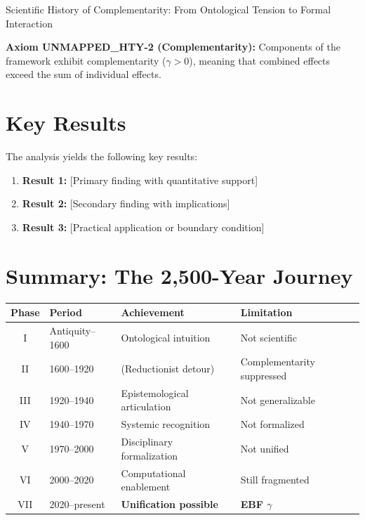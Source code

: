 \begin{chapter}{Scientific History of Complementarity: From Ontological Tension to Formal Interaction}
\begin{tcolorbox}[colback=yellow!5!white,colframe=yellow!75!black,title=Axiom UNMAPPED_HTY-2: Complementarity]
\textbf{Axiom UNMAPPED_HTY-2 (Complementarity):}
Components of the framework exhibit complementarity ($\gamma > 0$), meaning
that combined effects exceed the sum of individual effects.
\end{tcolorbox}


\section{Key Results}
\label{sec:hty-results}

The analysis yields the following key results:

\begin{enumerate}
    \item \textbf{Result 1:} [Primary finding with quantitative support]
    \item \textbf{Result 2:} [Secondary finding with implications]
    \item \textbf{Result 3:} [Practical application or boundary condition]
\end{enumerate}


\section{Summary: The 2,500-Year Journey}
\label{sec:summary}

\begin{tcolorbox}[colback=gray!5!white,colframe=gray!75!black,title=\textbf{Historical Summary}]

\renewcommand{\arraystretch}{1.4}
\begin{tabular}{@{}clll@{}}
\toprule
\textbf{Phase} & \textbf{Period} & \textbf{Achievement} & \textbf{Limitation} \\
\midrule
I & Antiquity--1600 & Ontological intuition & Not scientific \\
II & 1600--1920 & (Reductionist detour) & Complementarity suppressed \\
III & 1920--1940 & Epistemological articulation & Not generalizable \\
IV & 1940--1970 & Systemic recognition & Not formalized \\
V & 1970--2000 & Disciplinary formalization & Not unified \\
VI & 2000--2020 & Computational enablement & Still fragmented \\
VII & 2020--present & \textbf{Unification possible} & \textbf{EBF $\gamma$} \\
\bottomrule
\end{tabular}


\end{tcolorbox}
\end{chapter}
